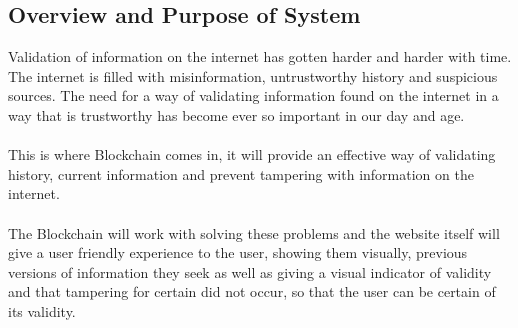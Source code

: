 \subsection{Overview and Purpose of System}

Validation of information on the internet has gotten harder and harder with time.
The internet is filled with misinformation, untrustworthy history and suspicious 
sources. The need for a way of validating information found on the internet in a 
way that is trustworthy has become ever so important in our day and age.\\ \\
\noindent
This is where Blockchain comes in, it will provide an effective way of validating
history, current information and prevent tampering with information on the internet.\\ \\
\noindent
The Blockchain will work with solving these problems and the website itself will
give a user friendly experience to the user, showing them visually, previous versions
of information they seek as well as giving a visual indicator of validity and that
tampering for certain did not occur, so that the user can be certain of its validity.
